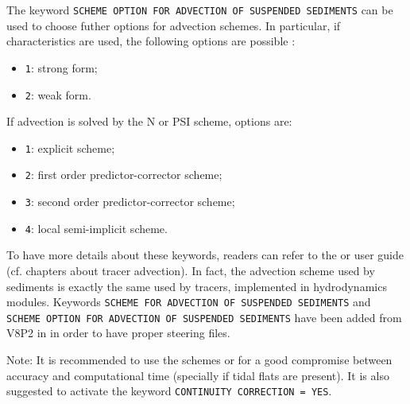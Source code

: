 The keyword \texttt{SCHEME OPTION FOR ADVECTION OF SUSPENDED SEDIMENTS} can be used to choose futher options for advection schemes. In particular, if characteristics are used, the following options are possible :
\begin{itemize}
\item \texttt{1}: strong form;
\item \texttt{2}: weak form.
\end{itemize}
If advection is solved by the N or PSI scheme, options are:
\begin{itemize}
\item \texttt{1}: explicit scheme;
\item \texttt{2}: first order predictor-corrector scheme;
\item \texttt{3}: second order predictor-corrector scheme;
\item \texttt{4}: local semi-implicit scheme.
\end{itemize}
To have more details about these keywords, readers can refer to the  or  user guide (cf. chapters about tracer advection). In fact, the advection scheme used by sediments is exactly the same used by tracers, implemented in hydrodynamics modules. Keywords \texttt{SCHEME FOR ADVECTION OF SUSPENDED SEDIMENTS} and \texttt{SCHEME OPTION FOR ADVECTION OF SUSPENDED SEDIMENTS} have been added from V8P2 in \gaia{} in order to have proper steering files.

\begin{WarningBlock}{Note:}
  It is recommended to use the schemes {} or {} for a good compromise between accuracy and computational time (specially if tidal flats are present). It is also suggested to activate
  the keyword \texttt{CONTINUITY CORRECTION = YES}.
\end{WarningBlock}

